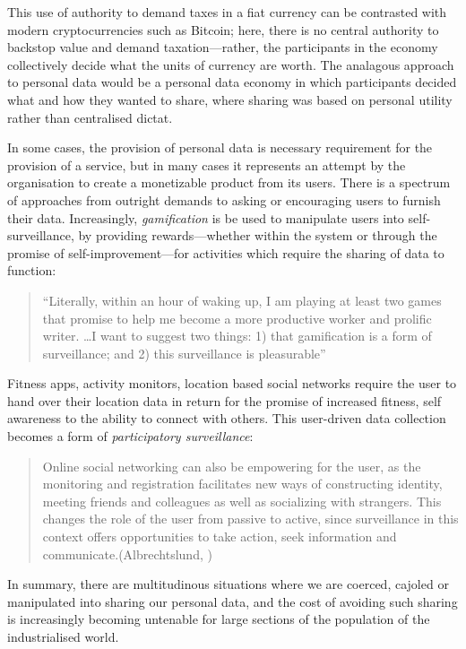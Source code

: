 \documentclass{IOS-Book-Article}     %
\begin{document}
This use of authority to demand taxes in a fiat currency can be contrasted with modern
cryptocurrencies such as Bitcoin; here, there is no central authority to 
backstop value and demand taxation---rather, the participants in the economy collectively decide what the units
of currency are worth. 
The analagous approach to personal data would be a personal data economy in
which participants decided what and how they wanted to share, where sharing was
based on personal utility rather than centralised dictat.

In some cases, the provision of personal data is
necessary requirement for the provision of a service, but in many
cases it represents an attempt by the organisation to create a monetizable product from
its users. There is a spectrum of approaches from outright demands 
to asking or encouraging users to furnish their data.
Increasingly, \emph{gamification} is be used to manipulate
users into self-surveillance, by providing rewards---whether within the system
or through the promise of self-improvement---for activities which require the
sharing of data to function:
\begin{quote}``Literally, within an hour of waking up, I am playing at least two games that promise to help me become a more productive
worker and prolific writer. \ldots I want to suggest two things: 1) that gamification is a form of
surveillance; and 2) this surveillance is
pleasurable''\cite{whitson2013gaming}\end{quote}
Fitness apps, activity monitors, location based social networks require the
user to hand over their location data in return for the promise of increased
fitness, self awareness to the ability to connect with others. 
This user-driven data collection becomes a form of \emph{participatory surveillance}:
\begin{quote}
Online social networking can also be empowering for the user, as the monitoring and 
registration facilitates new ways of constructing identity, meeting friends and colleagues 
as well as socializing with strangers. This changes the role of the user from passive to 
active, since surveillance in this context offers opportunities to take action, seek 
information and communicate.(Albrechtslund, \cite{albrechtslund2008online})
\end{quote} 

In summary, there are multitudinous situations where we are coerced, cajoled or
manipulated into sharing our personal data, and the cost of avoiding such
sharing is increasingly becoming untenable for large sections of the population
of the industrialised world.
\end{document}
